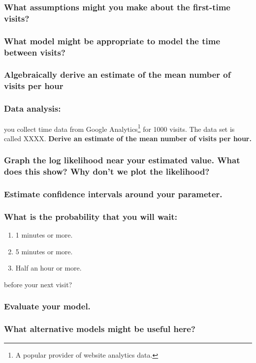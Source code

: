 \documentclass[11pt,fullpage]{book}
\begin{document}
\subsubsection{What assumptions might you make about the first-time visits?}
\subsubsection{What model might be appropriate to model the time between visits?}
\subsubsection{Algebraically derive an estimate of the mean number of visits per hour}
\subsubsection{Data analysis:} you collect time data from Google Analytics\footnote{A popular provider of website analytics data.} for 1000 visits. The data set is called XXXX. \textbf{Derive an estimate of the mean number of visits per hour.}
\subsubsection{Graph the log likelihood near your estimated value. What does this show? Why don't we plot the likelihood?}
\subsubsection{Estimate confidence intervals around your parameter.}
\subsubsection{What is the probability that you will wait:}
\begin{enumerate}
\item 1 minutes or more.
\item 5 minutes or more.
\item Half an hour or more.
\end{enumerate}
before your next visit?
\subsubsection{Evaluate your model.}
\subsubsection{What alternative models might be useful here?}
\end{document}
